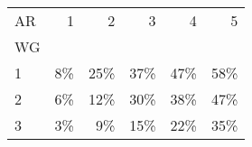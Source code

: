 \begin{tabular}{lrrrrr}
\toprule
AR &  1 &   2 &   3 &   4 &   5 \\
WG &    &     &     &     &     \\
\midrule
1  & 8\% & 25\% & 37\% & 47\% & 58\% \\
2  & 6\% & 12\% & 30\% & 38\% & 47\% \\
3  & 3\% &  9\% & 15\% & 22\% & 35\% \\
\bottomrule
\end{tabular}
